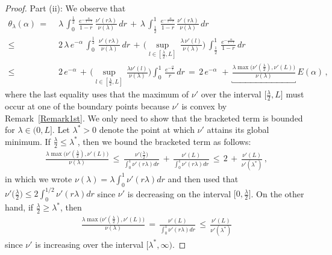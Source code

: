 \documentclass[10pt]{article}
\numberwithin{equation}{section}
\theoremstyle{definition}
\begin{document}
\begin{proof}
\noindent Part (ii): We observe that
\begin{align*}
 \theta_{\lambda}(\alpha) \,= \,&\,\lambda\,\int_0^{\frac{1}{2}}\, \frac{ e^{-\frac{\alpha}{1-r  }}  }{1-r   }\,\frac{ \nu'( r \lambda) }{\nu(\lambda)  } \,dr\,+\,\lambda \,\int_{\frac{1}{2}}^{1}\,\frac{ e^{-\frac{\alpha}{1-r  }}  }{1-r   }\,\frac{\nu'( r \lambda ) }{\nu(\lambda)  } \,dr \nonumber \\
    \leq \,&\,2\,\lambda\,e^{-\alpha}\,  \int_0^{\frac{1}{2}}\,\frac{ \nu'(r \lambda  ) }{\nu(\lambda)  }\,dr  \,+\,\Bigg( \sup_{l\in [\frac{\lambda}{2},L ]}\,\frac{\lambda \,\nu'(l ) }{\nu(\lambda)  }\Bigg)\,\int_{\frac{1}{2}}^{1}\,\frac{ e^{-\frac{\alpha}{1-r  }}  }{1-r   }\,dr \nonumber \\
     \leq \,&\,2\,e^{-\alpha}  \,+\,\Bigg( \sup_{l\in [\frac{\lambda}{2},L ]}\,\frac{\lambda \nu'(l ) }{\nu(\lambda)  }\Bigg)\int_{0}^{1}\,\frac{ e^{-\frac{\alpha}{r  }}  }{r   } \,dr\,
     = \,2\,e^{-\alpha} \,  \,+\, \underbracket{\frac{ \lambda \max\big( \nu'(\frac{\lambda}{ 2}),   \nu'(L)\big) }{ \nu(\lambda)  }}\,E( \alpha ) \,,\nonumber 
\end{align*}
where the last equality uses that the maximum of  $\nu'$ over the interval $ \big[\frac{\lambda}{2},L\big]$ must occur at one of the boundary points because  $\nu'$ is convex by Remark~\ref{Remark1st}.  We only need to show that the bracketed term is bounded for $\lambda\in (0,L]$. Let $\lambda^*>0$ denote the point at which $\nu'$ attains its global minimum.    If $ \frac{\lambda}{2} \leq \lambda^{*}$, then we bound the bracketed term as follows:
\begin{align*}
   \frac{\lambda \max\big( \nu'(\frac{\lambda}{ 2}),   \nu'(L)\big) }{ \nu(\lambda)  }\,\leq\, \frac{  \nu'\big(\frac{\lambda}{2}\big) }{ \int_0^1\nu'(r \lambda )dr }\,+\, \frac{  \nu'(L) }{ \int_0^1\nu'( r\lambda)dr }\,\leq \, 2\,+ \, \frac{  \nu'(L ) }{ \nu'(\lambda^*) }\,,
\end{align*}
in which we wrote $\nu(\lambda)=\lambda\int_0^{1}\nu'(r\lambda)dr $  and then used that $\nu'\big(\frac{\lambda}{2}\big) \leq  2\int_0^{1/2}\nu'( r\lambda)dr $ since $\nu'$ is decreasing on the interval $\big[0,\frac{\lambda}{2}\big]$. On the other hand,  if $\frac{\lambda }{2}\geq \lambda^{*}$, then 
\begin{align*}
    \frac{\lambda \max\big( \nu'(\frac{\lambda}{2}),   \nu'(L)\big) }{ \nu(\lambda)  }\, =\, \frac{  \nu'(L ) }{ \int_0^1\nu'( r\lambda)dr }\,\leq \, \frac{  \nu'(L ) }{ \nu'(\lambda^*) } 
\end{align*}
since $\nu'$ is increasing over the interval $[\lambda^{*},\infty) $.
\end{proof}
\end{document}
